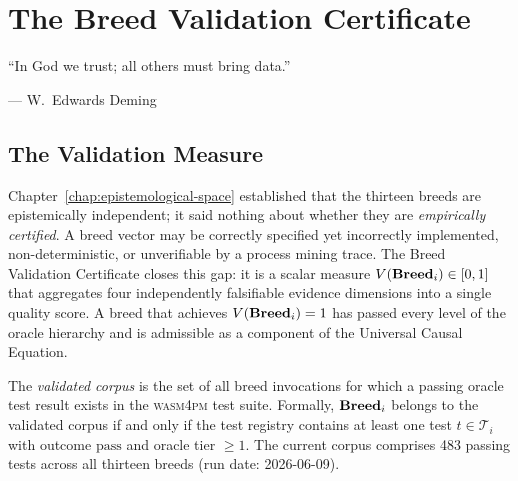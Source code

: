 
\chapter{The Breed Validation Certificate}
\label{chap:bvc}

\epigraph{%
  ``In God we trust; all others must bring data.''
}{--- W.\ Edwards Deming}

\section{The Validation Measure}
\label{sec:validation-measure}

Chapter~\ref{chap:epistemological-space} established that the thirteen breeds are
epistemically independent; it said nothing about whether they are \emph{empirically
certified}. A breed vector may be correctly specified yet incorrectly implemented,
non-deterministic, or unverifiable by a process mining trace. The Breed Validation
Certificate closes this gap: it is a scalar measure $V(\mathbf{Breed}_i) \in [0,1]$ that
aggregates four independently falsifiable evidence dimensions into a single quality score.
A breed that achieves $V(\mathbf{Breed}_i) = 1$ has passed every level of the oracle hierarchy
and is admissible as a component of the Universal Causal Equation.

\begin{definition}
\label{def:validated-corpus}
The \emph{validated corpus} is the set of all breed invocations for which a passing
oracle test result exists in the \textsc{wasm4pm} test suite.  Formally,
$\mathbf{Breed}_i$ belongs to the validated corpus if and only if the test registry contains
at least one test $t \in \mathcal{T}_i$ with outcome $\mathrm{pass}$ and oracle tier
$\geq 1$.  The current corpus comprises 483 passing tests across all thirteen breeds
(run date: 2026-06-09).
\end{definition}

